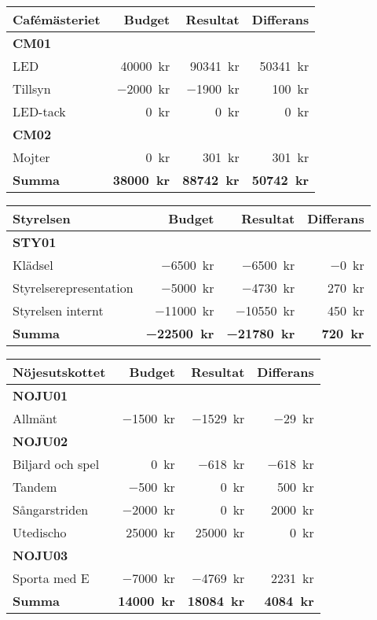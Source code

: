 \documentclass[../_main/handlingar.tex]{subfiles}
\begin{document}
\begin{tabularx}{12cm}{X r r r}
    \textbf{\large Cafémästeriet} & \textbf{Budget} & \textbf{Resultat} & \textbf{Differans} \\
    \hline
    \textbf{CM01} \\
    LED & \SI{40000}{kr} & \SI{90341}{kr} & \SI{50341}{kr} \\
    Tillsyn & \SI{-2000}{kr} & \SI{-1900}{kr} & \SI{100}{kr} \\
    LED-tack & \SI{0}{kr} & \SI{0}{kr} & \SI{0}{kr} \\
    \textbf{CM02} \\
    Mojter & \SI{0}{kr} & \SI{301}{kr} & \SI{301}{kr} \\
    \hline
    \textbf{Summa} & \textbf{\SI{38000}{kr}} & \textbf{\SI{88742}{kr}} & \textbf{\SI{50742}{kr}} \\
\end{tabularx}

\begin{tabularx}{12cm}{X r r r}
    \textbf{\large Styrelsen} & \textbf{Budget} & \textbf{Resultat} & \textbf{Differans} \\
    \hline
    \textbf{STY01} \\
    Klädsel & \SI{-6500}{kr} & \SI{-6500}{kr} & \SI{-0}{kr} \\
    Styrelserepresentation & \SI{-5000}{kr} & \SI{-4730}{kr} & \SI{270}{kr} \\
    Styrelsen internt & \SI{-11000}{kr} & \SI{-10550}{kr} & \SI{450}{kr} \\
    \hline
    \textbf{Summa} & \textbf{\SI{-22500}{kr}} & \textbf{\SI{-21780}{kr}} & \textbf{\SI{720}{kr}} \\
\end{tabularx}

\begin{tabularx}{12cm}{X r r r}
    \textbf{\large Nöjesutskottet} & \textbf{Budget} & \textbf{Resultat} & \textbf{Differans} \\
    \hline
    \textbf{NOJU01} \\
    Allmänt & \SI{-1500}{kr} & \SI{-1529}{kr} & \SI{-29}{kr} \\
    \textbf{NOJU02} \\
    Biljard och spel & \SI{0}{kr} & \SI{-618}{kr} & \SI{-618}{kr} \\
    Tandem & \SI{-500}{kr} & \SI{0}{kr} & \SI{500}{kr} \\
    Sångarstriden & \SI{-2000}{kr} & \SI{0}{kr} & \SI{2000}{kr} \\
    Utedischo & \SI{25000}{kr} & \SI{25000}{kr} & \SI{0}{kr} \\
    \textbf{NOJU03} \\
    Sporta med E & \SI{-7000}{kr} & \SI{-4769}{kr} & \SI{2231}{kr} \\
    \hline
    \textbf{Summa} & \textbf{\SI{14000}{kr}} & \textbf{\SI{18084}{kr}} & \textbf{\SI{4084}{kr}} \\
\end{tabularx}
\end{document}
